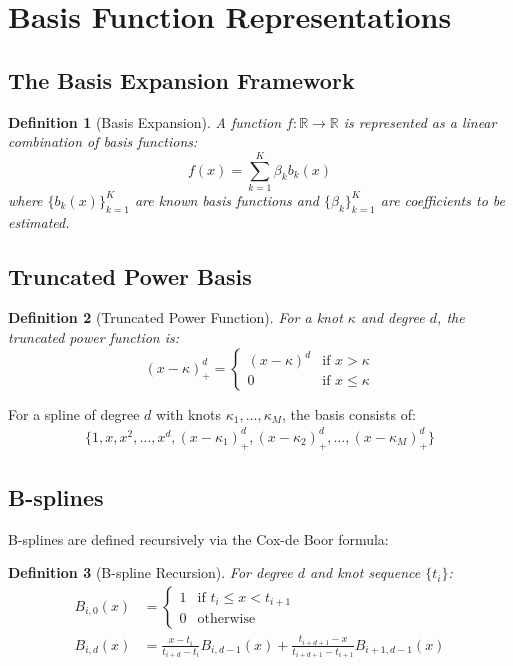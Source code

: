 \documentclass[12pt]{article}
\newtheorem{definition}{Definition}
\newcommand{\R}{\mathbb{R}}
\begin{document}
\section{Basis Function Representations}

\subsection{The Basis Expansion Framework}

\begin{definition}[Basis Expansion]
A function $f: \R \to \R$ is represented as a linear combination of basis functions:
\begin{equation}
f(x) = \sum_{k=1}^{K} \beta_k b_k(x)
\end{equation}
where $\{b_k(x)\}_{k=1}^K$ are known basis functions and $\{\beta_k\}_{k=1}^K$ are coefficients to be estimated.
\end{definition}

\subsection{Truncated Power Basis}

\begin{definition}[Truncated Power Function]
For a knot $\kappa$ and degree $d$, the truncated power function is:
\begin{equation}
(x - \kappa)_+^d = \begin{cases}
(x - \kappa)^d & \text{if } x > \kappa \\
0 & \text{if } x \leq \kappa
\end{cases}
\end{equation}
\end{definition}

For a spline of degree $d$ with knots $\kappa_1, \ldots, \kappa_M$, the basis consists of:
\begin{align}
\{1, x, x^2, \ldots, x^d, (x-\kappa_1)_+^d, (x-\kappa_2)_+^d, \ldots, (x-\kappa_M)_+^d\}
\end{align}

\subsection{B-splines}

B-splines are defined recursively via the Cox-de Boor formula:

\begin{definition}[B-spline Recursion]
For degree $d$ and knot sequence $\{t_i\}$:
\begin{align}
B_{i,0}(x) &= \begin{cases}
1 & \text{if } t_i \leq x < t_{i+1} \\
0 & \text{otherwise}
\end{cases} \\
B_{i,d}(x) &= \frac{x - t_i}{t_{i+d} - t_i} B_{i,d-1}(x) + \frac{t_{i+d+1} - x}{t_{i+d+1} - t_{i+1}} B_{i+1,d-1}(x)
\end{align}
\end{definition}
\end{document}
